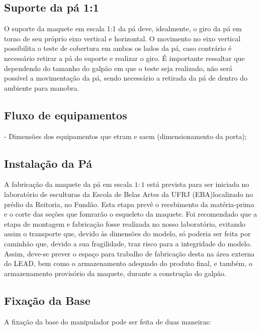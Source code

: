  \subsection{Suporte da pá 1:1}
 O suporte da maquete em escala 1:1 da pá deve, idealmente, o giro da pá em
 torno de seu próprio eixo vertical e horizontal. 
 O movimento no eixo vertical possibilita o teste de cobertura em ambos os lados
 da pá, caso contrário é necessário retirar a pá do suporte e realizar o giro.
 É importante ressaltar que dependendo do tamanho do galpão em que o teste seja
 realizado, não será possível a movimentação da pá, sendo necessário a retirada
 da pá de dentro do ambiente para manobra.
 
 \subsection{Fluxo de equipamentos}
- Dimensões dos equipamentos que etram e saem (dimensionamento da porta);

\subsection{Instalação da Pá}\label{sec::instal_pa}

A fabricação da maquete da pá em escala $1:1$ está prevista para ser iniciada no
laboratório de esculturas da Escola de Belas Artes da UFRJ (EBA)localizado no
prédio da Reitoria, no Fundão.
Esta etapa prevê o recebimento da matéria-prima e o corte das seções que
fomrarão o esqueleto da maquete. 
Foi recomendado que a etapa de montagem e fabricação fosse realizada no nosso
laboratório, evitando assim o transporte que, devido às dimensões do modelo,  só
poderia ser feita por caminhão que, devido a sua fragilidade, traz risco para a
integridade do modelo.
Assim, deve-se prever o espaço para trabalho de fabricação desta na área externa
do LEAD, bem como o armazenamento adequado do produto final, e também, o
armazenamento provisório da maquete, durante a construção do galpão.

\subsection{Fixação da Base}\label{sec::fix_base}

A fixação da base do manipulador pode ser feita de duas maneiras:

